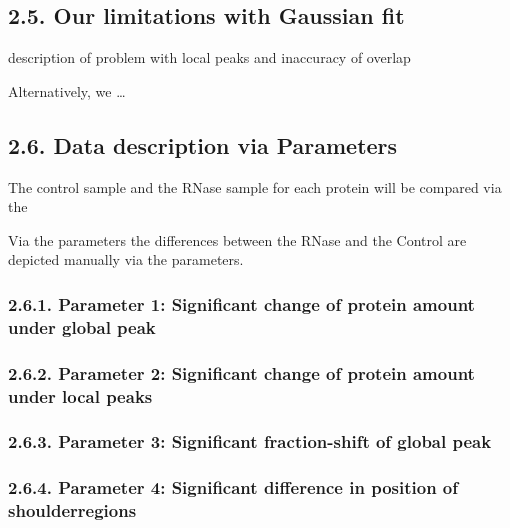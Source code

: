 \documentclass[
]{article}
\begin{document}
\hypertarget{our-limitations-with-gaussian-fit}{%
\subsection{2.5. Our limitations with Gaussian
fit}\label{our-limitations-with-gaussian-fit}}

description of problem with local peaks and inaccuracy of overlap

Alternatively, we \ldots{}

\hypertarget{data-description-via-parameters}{%
\subsection{2.6. Data description via
Parameters}\label{data-description-via-parameters}}

The control sample and the RNase sample for each protein will be
compared via the

Via the parameters the differences between the RNase and the Control are
depicted manually via the parameters.

\hypertarget{parameter-1-significant-change-of-protein-amount-under-global-peak}{%
\subsubsection{2.6.1. Parameter 1: Significant change of protein amount
under global
peak}\label{parameter-1-significant-change-of-protein-amount-under-global-peak}}

\hypertarget{parameter-2-significant-change-of-protein-amount-under-local-peaks}{%
\subsubsection{2.6.2. Parameter 2: Significant change of protein amount
under local
peaks}\label{parameter-2-significant-change-of-protein-amount-under-local-peaks}}

\hypertarget{parameter-3-significant-fraction-shift-of-global-peak}{%
\subsubsection{2.6.3. Parameter 3: Significant fraction-shift of global
peak}\label{parameter-3-significant-fraction-shift-of-global-peak}}

\hypertarget{parameter-4-significant-difference-in-position-of-shoulderregions}{%
\subsubsection{2.6.4. Parameter 4: Significant difference in position of
shoulderregions}\label{parameter-4-significant-difference-in-position-of-shoulderregions}}
\end{document}
